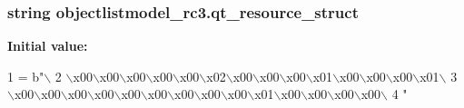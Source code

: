 \subsubsection[{qt\+\_\+resource\+\_\+struct}]{\setlength{\rightskip}{0pt plus 5cm}string objectlistmodel\+\_\+rc3.\+qt\+\_\+resource\+\_\+struct}\label{namespaceobjectlistmodel__rc3_aa55cc5117b1a2e6a98d3290064fc9916}
{\bfseries Initial value\+:}
\begin{DoxyCode}
1 = b\textcolor{stringliteral}{"\(\backslash\)}
2 \textcolor{stringliteral}{\(\backslash\)x00\(\backslash\)x00\(\backslash\)x00\(\backslash\)x00\(\backslash\)x00\(\backslash\)x02\(\backslash\)x00\(\backslash\)x00\(\backslash\)x00\(\backslash\)x01\(\backslash\)x00\(\backslash\)x00\(\backslash\)x00\(\backslash\)x01\(\backslash\)}
3 \textcolor{stringliteral}{\(\backslash\)x00\(\backslash\)x00\(\backslash\)x00\(\backslash\)x00\(\backslash\)x00\(\backslash\)x00\(\backslash\)x00\(\backslash\)x00\(\backslash\)x00\(\backslash\)x01\(\backslash\)x00\(\backslash\)x00\(\backslash\)x00\(\backslash\)x00\(\backslash\)}
4 \textcolor{stringliteral}{"}
\end{DoxyCode}
